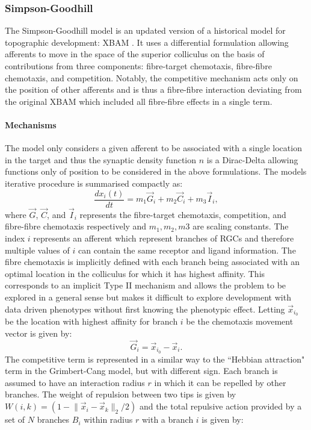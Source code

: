 \subsubsection{Simpson-Goodhill}
The Simpson-Goodhill model is an updated version of a historical model for topographic development: XBAM \cite{Hope1976-vx, Overton1982-sr}. It uses a differential formulation allowing afferents to move in the space of the superior colliculus on the basis of contributions from three components: fibre-target chemotaxis, fibre-fibre chemotaxis, and competition. Notably, the competitive mechanism acts only on the position of other afferents and is thus a fibre-fibre interaction deviating from the original XBAM which included all fibre-fibre effects in a single term. 
\paragraph{Mechanisms}
The model only considers a given afferent to be associated with a single location in the target and thus the synaptic density function $n$ is a Dirac-Delta allowing functions only of position to be considered in the above formulations. The models iterative procedure is summarised compactly as:
\begin{equation}
\frac{dx_i(t)}{dt} = m_1 \vec{G}_i + m_2 \vec{C}_i + m_3 \vec{I}_i, \label{eq:simpsongoodhilliteration}
\end{equation}
where $\vec{G}$, $\vec{C}$, and $\vec{I}_i$ represents the fibre-target chemotaxis, competition, and fibre-fibre chemotaxis respectively and $m_1, m_2, m3$ are scaling constants. The index $i$ represents an afferent which represent branches of RGCs and therefore multiple values of $i$ can contain the same receptor and ligand information. The fibre chemotaxis is implicitly defined with each branch being associated with an optimal location in the colliculus for which it has highest affinity. This corresponds to an implicit Type II mechanism and allows the problem to be explored in a general sense but makes it difficult to explore development with data driven phenotypes without first knowing the phenotypic effect. Letting $\vec{x}_{i_0}$ be the location with highest affinity for branch $i$ be the chemotaxis movement vector is given by:
\begin{equation}
\vec{G}_i = \vec{x}_{i_0} - \vec{x}_i.
\end{equation}
The competitive term is represented in a similar way to the ``Hebbian attraction" term in the Grimbert-Cang model, but with different sign. Each branch is assumed to have an interaction radius $r$ in which it can be repelled by other branches. The weight of repulsion between two tips is given by $W(i, k) = (1 - \lVert \vec{x}_i - \vec{x}_k \rVert_2/2)$ and the total repulsive action provided by a set of $N$ branches $B_i$ within radius $r$ with a branch $i$ is given by:

